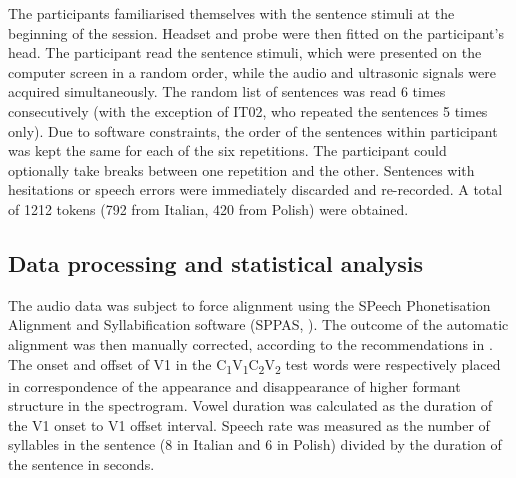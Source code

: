 \documentclass[12pt,]{article}
\begin{document}
The participants familiarised themselves with the sentence stimuli at
the beginning of the session. Headset and probe were then fitted on the
participant's head. The participant read the sentence stimuli, which
were presented on the computer screen in a random order, while the audio
and ultrasonic signals were acquired simultaneously. The random list of
sentences was read 6 times consecutively (with the exception of IT02,
who repeated the sentences 5 times only). Due to software constraints,
the order of the sentences within participant was kept the same for each
of the six repetitions. The participant could optionally take breaks
between one repetition and the other. Sentences with hesitations or
speech errors were immediately discarded and re-recorded. A total of
1212 tokens (792 from Italian, 420 from Polish) were obtained.

\hypertarget{data-processing-and-statistical-analysis}{%
\subsection{Data processing and statistical
analysis}\label{data-processing-and-statistical-analysis}}

\label{s:process}

The audio data was subject to force alignment using the SPeech
Phonetisation Alignment and Syllabification software (SPPAS,
\citealt{bigi2015}). The outcome of the automatic alignment was then
manually corrected, according to the recommendations in
\citet{machac2009}. The onset and offset of V1 in the
C\textsubscript{1}V\textsubscript{1}C\textsubscript{2}V\textsubscript{2}
test words were respectively placed in correspondence of the appearance
and disappearance of higher formant structure in the spectrogram. Vowel
duration was calculated as the duration of the V1 onset to V1 offset
interval. Speech rate was measured as the number of syllables in the
sentence (8 in Italian and 6 in Polish) divided by the duration of the
sentence in seconds.
\end{document}
